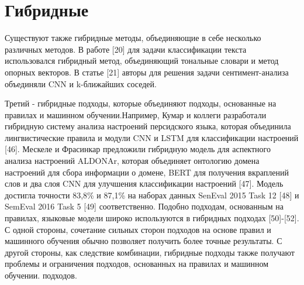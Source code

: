 \section{Гибридные}

Существуют также гибридные методы, объединяющие в себе несколько различных
методов.  В работе [20] для задачи классификации текста использовался гибридный
метод, объединяющий тональные словари и метод опорных векторов.  В статье [21]
авторы для решения задачи сентимент-анализа объединяли CNN и k-ближайших
соседей.~\cite{article14}

Третий - гибридные подходы, которые объединяют подходы, основанные на правилах и
машинном обучении.Например, Кумар и коллеги разработали гибридную систему
анализа настроений персидского языка, которая объединила лингвистические правила
и модули CNN и LSTM для классификации настроений [46]. Мескеле и Фрасинкар
предложили гибридную модель для аспектного анализа настроений ALDONAr, которая
объединяет онтологию домена настроений для сбора информации о домене, BERT для
получения вкраплений слов и два слоя CNN для улучшения классификации настроений
[47]. Модель достигла точности 83,8\% и 87,1\% на наборах данных SenEval 2015
Task 12 [48] и SemEval 2016 Task 5 [49] соответственно. Подобно подходам,
основанным на правилах, языковые модели широко используются в гибридных подходах
[50]-[52].  С одной стороны, сочетание сильных сторон подходов на основе правил
и машинного обучения обычно позволяет получить более точные результаты. С другой
стороны, как следствие комбинации, гибридные подходы также получают проблемы и
ограничения подходов, основанных на правилах и машинном обучении.
подходов.\cite{article15}

